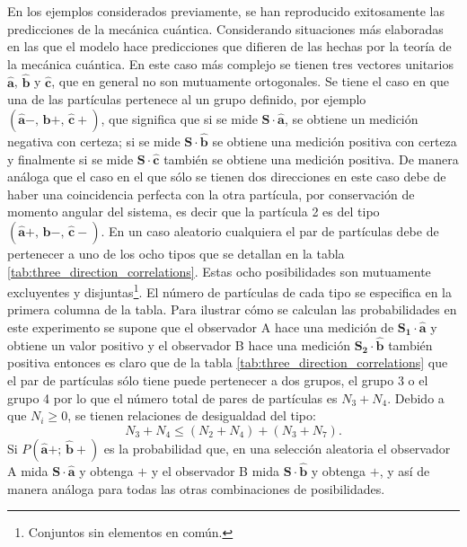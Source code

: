 \documentclass[a4paper]{article}
\begin{document}
En los ejemplos considerados previamente, se han reproducido exitosamente las predicciones de la mecánica cuántica. Considerando situaciones más elaboradas en las que el modelo hace predicciones que difieren de las hechas por la teoría de la mecánica cuántica. En este caso más complejo se tienen tres vectores unitarios $\mathbf{\hat{a}}$, $\mathbf{\hat{b}}$ y $\mathbf{\hat{c}}$, que en general no son mutuamente ortogonales. Se tiene el caso en que una de las partículas pertenece al un grupo definido, por ejemplo $(\mathbf{\hat{a}}-,\, \mathbf{\hat{b}}+,\,\mathbf{\hat{c}}+)$, que significa que si se mide $\mathbf{S}\cdot \mathbf{\hat{a}}$, se obtiene un medición negativa con certeza; si se mide $\mathbf{S}\cdot \mathbf{\hat{b}}$ se obtiene una medición positiva con certeza y finalmente si se mide $\mathbf{S}\cdot \mathbf{\hat{c}}$ también se obtiene una medición positiva. De manera análoga que el caso en el que sólo se tienen dos direcciones en este caso debe de haber una coincidencia perfecta con la otra partícula, por conservación de momento angular del sistema, es decir que la partícula 2 es del tipo $(\mathbf{\hat{a}}+,\, \mathbf{\hat{b}}-,\,\mathbf{\hat{c}}-)$. En un caso aleatorio cualquiera el par de partículas debe de pertenecer a uno de los ocho tipos que se detallan en la tabla \ref{tab:three_direction_correlations}. Estas ocho posibilidades son mutuamente excluyentes y disjuntas\footnote{Conjuntos sin elementos en común.}. El número de partículas de cada tipo se especifica en la primera columna de la tabla. Para ilustrar cómo se calculan las probabilidades en este experimento se supone que el observador A hace una medición de $\mathbf{S_1}\cdot \mathbf{\hat{a}}$ y obtiene un valor positivo y el observador B hace una medición $\mathbf{S_2}\cdot \mathbf{\hat{b}}$ también positiva entonces es claro que de la tabla \ref{tab:three_direction_correlations} que el par de partículas sólo tiene puede pertenecer a dos grupos, el grupo 3 o el grupo 4 por lo que el número total de pares de partículas es $N_3 + N_4$. Debido a que $N_i\geq 0$, se tienen relaciones de desigualdad del tipo:
\begin{equation}\label{eq::positivity_condition}
N_3 + N_4 \leq (N_2 +  N_4) + (N_3 +  N_7).
\end{equation} 
Si $P(\mathbf{\hat{a}}+;\,\mathbf{\hat{b}}+)$ es la probabilidad que, en una selección aleatoria el observador A mida $\mathbf{S}\cdot \mathbf{\hat{a}}$ y obtenga $+$ y el observador B mida $\mathbf{S}\cdot \mathbf{\hat{b}}$ y obtenga $+$, y así de manera análoga para todas las otras combinaciones de posibilidades.	
\end{document}
